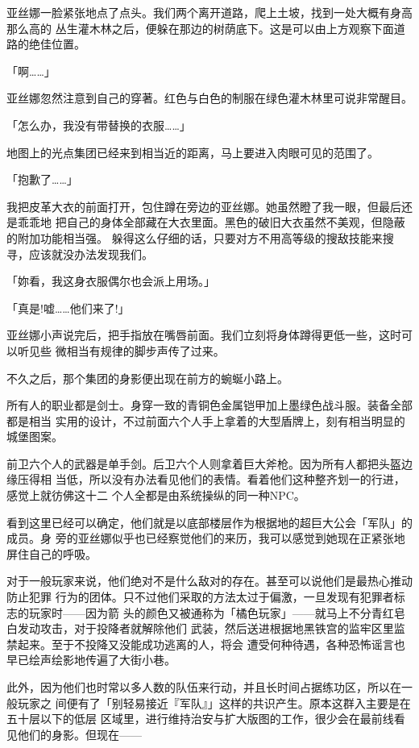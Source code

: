 \documentclass[11pt]{book}
\begin{document}
亚丝娜一脸紧张地点了点头。我们两个离开道路，爬上土坡，找到一处大概有身高那么高的
丛生灌木林之后，便躲在那边的树荫底下。这是可以由上方观察下面道路的绝佳位置。

「啊……」

亚丝娜忽然注意到自己的穿著。红色与白色的制服在绿色灌木林里可说非常醒目。

「怎么办，我没有带替换的衣服……」

地图上的光点集团已经来到相当近的距离，马上要进入肉眼可见的范围了。

「抱歉了……」

我把皮革大衣的前面打开，包住蹲在旁边的亚丝娜。她虽然瞪了我一眼，但最后还是乖乖地
把自己的身体全部藏在大衣里面。黑色的破旧大衣虽然不美观，但隐蔽的附加功能相当强。
躲得这么仔细的话，只要对方不用高等级的搜敌技能来搜寻，应该就没办法发现我们。







「妳看，我这身衣服偶尔也会派上用场。」

「真是!嘘……他们来了!」

亚丝娜小声说完后，把手指放在嘴唇前面。我们立刻将身体蹲得更低一些，这时可以听见些
微相当有规律的脚步声传了过来。

不久之后，那个集团的身影便出现在前方的蜿蜒小路上。

所有人的职业都是剑士。身穿一致的青铜色金属铠甲加上墨绿色战斗服。装备全部都是相当
实用的设计，不过前面六个人手上拿着的大型盾牌上，刻有相当明显的城堡图案。

前卫六个人的武器是单手剑。后卫六个人则拿着巨大斧枪。因为所有人都把头盔边缘压得相
当低，所以没有办法看见他们的表情。看着他们这种整齐划一的行进，感觉上就彷佛这十二
个人全都是由系统操纵的同一种NPC。

看到这里已经可以确定，他们就是以底部楼层作为根据地的超巨大公会「军队」的成员。身
旁的亚丝娜似乎也已经察觉他们的来历，我可以感觉到她现在正紧张地屏住自己的呼吸。

对于一般玩家来说，他们绝对不是什么敌对的存在。甚至可以说他们是最热心推动防止犯罪
行为的团体。只不过他们采取的方法太过于偏激，一旦发现有犯罪者标志的玩家时——因为箭
头的颜色又被通称为「橘色玩家」——就马上不分青红皂白发动攻击，对于投降者就解除他们
武装，然后送进根据地黑铁宫的监牢区里监禁起来。至于不投降又没能成功逃离的人，将会
遭受何种待遇，各种恐怖谣言也早已绘声绘影地传遍了大街小巷。

此外，因为他们也时常以多人数的队伍来行动，并且长时间占据练功区，所以在一般玩家之
间便有了「别轻易接近『军队』」这样的共识产生。原本这群入主要是在五十层以下的低层
区域里，进行维持治安与扩大版图的工作，很少会在最前线看见他们的身影。但现在——
\end{document}
